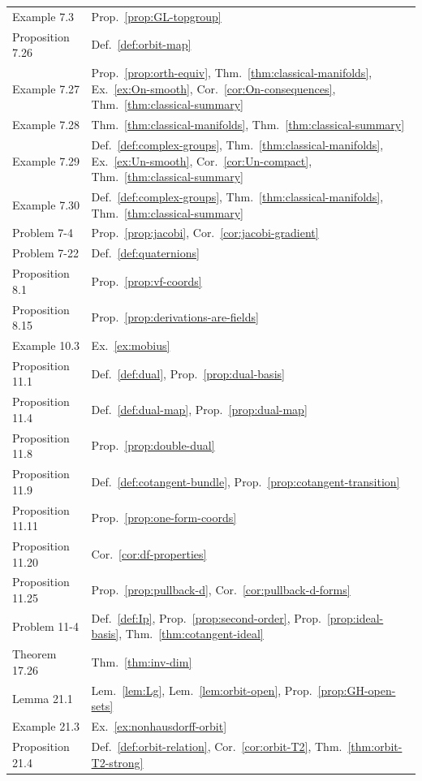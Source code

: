\documentclass[11pt]{report}
\begin{document}
{\begin{longtable}{>{\raggedright\arraybackslash}p{3.6cm} >{\raggedright\arraybackslash}p{11.2cm}}
Example 7.3 & Prop.~\ref{prop:GL-topgroup} \\
Proposition 7.26 & Def.~\ref{def:orbit-map} \\
Example 7.27 & Prop.~\ref{prop:orth-equiv}, Thm.~\ref{thm:classical-manifolds}, Ex.~\ref{ex:On-smooth}, Cor.~\ref{cor:On-consequences}, Thm.~\ref{thm:classical-summary} \\
Example 7.28 & Thm.~\ref{thm:classical-manifolds}, Thm.~\ref{thm:classical-summary} \\
Example 7.29 & Def.~\ref{def:complex-groups}, Thm.~\ref{thm:classical-manifolds}, Ex.~\ref{ex:Un-smooth}, Cor.~\ref{cor:Un-compact}, Thm.~\ref{thm:classical-summary} \\
Example 7.30 & Def.~\ref{def:complex-groups}, Thm.~\ref{thm:classical-manifolds}, Thm.~\ref{thm:classical-summary} \\
Problem 7-4 & Prop.~\ref{prop:jacobi}, Cor.~\ref{cor:jacobi-gradient} \\
Problem 7-22 & Def.~\ref{def:quaternions} \\
Proposition 8.1 & Prop.~\ref{prop:vf-coords} \\
Proposition 8.15 & Prop.~\ref{prop:derivations-are-fields} \\
Example 10.3 & Ex.~\ref{ex:mobius} \\
Proposition 11.1 & Def.~\ref{def:dual}, Prop.~\ref{prop:dual-basis} \\
Proposition 11.4 & Def.~\ref{def:dual-map}, Prop.~\ref{prop:dual-map} \\
Proposition 11.8 & Prop.~\ref{prop:double-dual} \\
Proposition 11.9 & Def.~\ref{def:cotangent-bundle}, Prop.~\ref{prop:cotangent-transition} \\
Proposition 11.11 & Prop.~\ref{prop:one-form-coords} \\
Proposition 11.20 & Cor.~\ref{cor:df-properties} \\
Proposition 11.25 & Prop.~\ref{prop:pullback-d}, Cor.~\ref{cor:pullback-d-forms} \\
Problem 11-4 & Def.~\ref{def:Ip}, Prop.~\ref{prop:second-order}, Prop.~\ref{prop:ideal-basis}, Thm.~\ref{thm:cotangent-ideal} \\
Theorem 17.26 & Thm.~\ref{thm:inv-dim} \\
Lemma 21.1 & Lem.~\ref{lem:Lg}, Lem.~\ref{lem:orbit-open}, Prop.~\ref{prop:GH-open-sets} \\
Example 21.3 & Ex.~\ref{ex:nonhausdorff-orbit} \\
Proposition 21.4 & Def.~\ref{def:orbit-relation}, Cor.~\ref{cor:orbit-T2}, Thm.~\ref{thm:orbit-T2-strong} \\

\end{longtable}}
\end{document}
